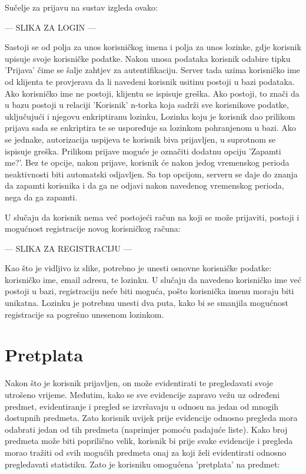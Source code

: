 \documentclass[times, utf8, zavrsni]{fer}
\begin{document}
Sučelje za prijavu na sustav izgleda ovako:

--- SLIKA ZA LOGIN ---

Sastoji se od polja za unos korisničkog imena i polja za unos lozinke, gdje korisnik upisuje svoje korisničke podatke. Nakon unosa podataka korisnik odabire tipku 'Prijava' čime se šalje zahtjev za autentifikaciju. Server tada uzima korisničko ime od klijenta te provjerava da li navedeni korisnik usitinu postoji u bazi podataka. Ako korisničko ime ne postoji, klijentu se ispisuje greška. Ako postoji, to znači da u bazu postoji u relaciji 'Korisnik' n-torka koja sadrži sve korisnikove podatke, uključujući i njegovu enkriptiranu lozinku, Lozinka koju je korisnik dao prilikom prijava sada se enkriptira te se uspoređuje sa lozinkom pohranjenom u bazi. Ako se jednake, autorizacija uspijeva te korisnik biva prijavljen, u suprotnom se ispisuje greška. 
Prilikom prijave moguće je označiti dodatnu opciju 'Zapamti me?'. Bez te opcije, nakon prijave, korisnik će nakon jedog vremenskog perioda neaktivnosti biti automatski odjavljen. Sa top opcijom, serveru se daje do znanja da zapamti korisnika i da ga ne odjavi nakon navedenog vremenskog perioda, nega da ga zapamti.

U slučaju da korisnik nema već postojeći račun na koji se može prijaviti, postoji i mogućnost registracije novog korisničkog računa:

--- SLIKA ZA REGISTRACIJU ---

Kao što je vidljivo iz slike, potrebno je unesti osnovne korisničke podatke: korisničko ime, email adresu, te lozinku. U slučaju da navedeno korisničko ime već postoji u bazi, registraciju neće biti moguća, pošto korisnička imenu moraju biti unikatna. Lozinku je potrebnu unesti dva puta, kako bi se smanjila mogućnost registracije sa pogrešno unesenom lozinkom.

\section{Pretplata}
Nakon što je korisnik prijavljen, on može evidentirati te pregledavati svoje utrošeno vrijeme. Međutim, kako se sve evidencije zapravo vežu uz određeni predmet, evidentiranje i pregled se izvršavaju u odnosu na jedan od mnogih dostupnih predmeta. Zato korisnik uvijek prije evidencije odnosno pregleda mora odabrati jedan od tih predmeta (naprimjer pomoću padajuće liste). Kako broj predmeta može biti poprilično velik, korisnik bi prije svake evidencije i pregleda morao tražiti od svih mogućih predmeta onaj za koji želi evidentirati odnosno pregledavati statistiku. Zato je korisniku omogućena 'pretplata' na predmet:
\end{document}
